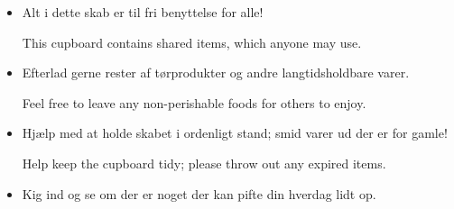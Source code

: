 \documentclass{article}
\begin{document}

\maketitle

\null

\huge

\begin{itemize}

\item Alt i dette skab er til fri benyttelse for alle!

\english This cupboard contains shared items, which anyone may use. 

\vspace{0.3in}

\dansk\item Efterlad gerne rester af tørprodukter og andre langtidsholdbare
varer.

\english Feel free to leave any non-perishable foods for others to enjoy.

\vspace{0.3in}

\dansk \item Hjælp med at holde skabet i ordenligt stand; smid varer ud der er
for gamle!

\english Help keep the cupboard tidy; please throw out any expired items.

\vspace{0.3in}

\dansk\item Kig ind og se om der er noget der kan pifte din hverdag lidt op.

\end{itemize}

\underskriv
\end{document}
